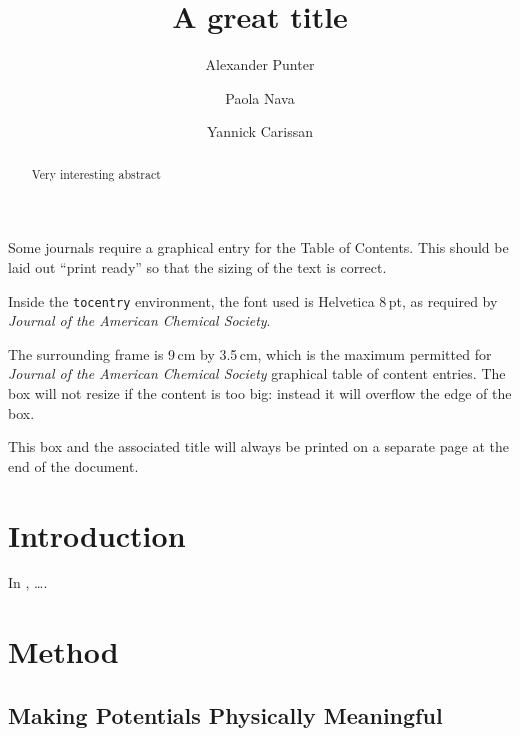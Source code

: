 \documentclass[journal=jctcce,manuscript=article]{achemso}
\author{Alexander Punter}
\author{Paola Nava}
\author{Yannick Carissan}
\affiliation[Aix-Marseille University]
{Aix Marseille Univ, CNRS, Centrale Marseille, iSm2, Marseille, France}
\title[A great title]
  {A great title}
\begin{document}
\begin{tocentry}

Some journals require a graphical entry for the Table of Contents.
This should be laid out ``print ready'' so that the sizing of the
text is correct.

Inside the \texttt{tocentry} environment, the font used is Helvetica
8\,pt, as required by \emph{Journal of the American Chemical
Society}.

The surrounding frame is 9\,cm by 3.5\,cm, which is the maximum
permitted for  \emph{Journal of the American Chemical Society}
graphical table of content entries. The box will not resize if the
content is too big: instead it will overflow the edge of the box.

This box and the associated title will always be printed on a
separate page at the end of the document.

\end{tocentry}

\begin{abstract}
Very interesting abstract
\end{abstract}

\section{Introduction}

In \cite{Drujon2013}, \ldots .

\section{Method}

\subsection{Making Potentials Physically Meaningful}
\end{document}
